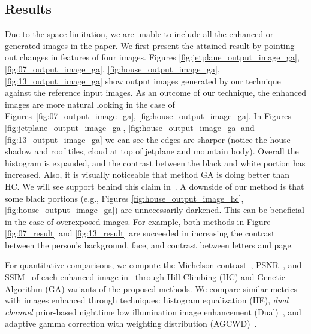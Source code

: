 \subsection{Results}
\label{subsection:exp_result_result}

Due to the space limitation, we are unable to include all the enhanced or generated images in the paper. 
We first present the attained result by pointing out changes in features of four images. 
Figures \ref{fig:jetplane_output_image_ga}, \ref{fig:07_output_image_ga}, \ref{fig:house_output_image_ga}, \ref{fig:13_output_image_ga} show output images generated by our technique against the reference input images.
As an outcome of our technique, the enhanced images are more natural looking in the case of Figures~\ref{fig:07_output_image_ga}, \ref{fig:house_output_image_ga}. In Figures \ref{fig:jetplane_output_image_ga},
\ref{fig:house_output_image_ga} and \ref{fig:13_output_image_ga} we can see the edges are sharper (notice the house shadow and roof tiles, cloud at top of jetplane and mountain body). Overall the histogram is expanded, and the contrast between the black and white portion has increased. Also, it is visually noticeable that method GA is doing better than HC. We will see support behind this claim in~. A downside of our method is that some black portions (e.g., Figures \ref{fig:house_output_image_hc}, \ref{fig:house_output_image_ga}) are unnecessarily darkened. This can be beneficial in the case of overexposed images. For example, both methods in Figure \ref{fig:07_result} and \ref{fig:13_result} are succeeded in increasing the contrast between the person's background, face, and contrast between letters and page.

For quantitative comparisons, we compute the Michelson contrast~\cite{michelson1995studies,rizzi2004proposal}, PSNR~\cite{asamoah2018measuring}, and SSIM~\cite{WBSS2004} of each enhanced image in~ through Hill Climbing (HC) and Genetic Algorithm (GA) variants of the proposed methods. 
We compare similar metrics with images enhanced through techniques: histogram equalization (HE),  {\em dual channel} prior-based nighttime low illumination image enhancement (Dual)~\cite{SZGZZ2018}, and adaptive gamma correction with weighting distribution (AGCWD)~\cite{HCC2012}. 

